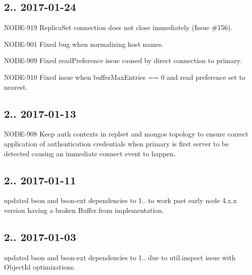 \subsection*{2.. 2017-\/01-\/24 }


\begin{DoxyItemize}
\item N\+O\+D\+E-\/919 Replica\+Set connection does not close immediately (Issue \#156).
\item N\+O\+D\+E-\/901 Fixed bug when normalizing host names.
\item N\+O\+D\+E-\/909 Fixed read\+Preference issue caused by direct connection to primary.
\item N\+O\+D\+E-\/910 Fixed issue when buffer\+Max\+Entries == 0 and read preference set to nearest.
\end{DoxyItemize}

\subsection*{2.. 2017-\/01-\/13 }


\begin{DoxyItemize}
\item N\+O\+D\+E-\/908 Keep auth contexts in replset and mongos topology to ensure correct application of authentication credentials when primary is first server to be detected causing an immediate connect event to happen.
\end{DoxyItemize}

\subsection*{2.. 2017-\/01-\/11 }


\begin{DoxyItemize}
\item updated bson and bson-\/ext dependencies to 1.. to work past early node 4.\+x.\+x version having a broken Buffer.\+from implementation.
\end{DoxyItemize}

\subsection*{2.. 2017-\/01-\/03 }


\begin{DoxyItemize}
\item updated bson and bson-\/ext dependencies to 1.. due to util.\+inspect issue with Object\+Id optimizations.
\end{DoxyItemize}

